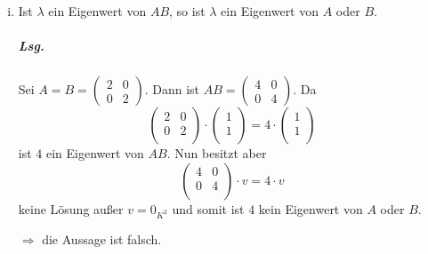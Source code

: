 \documentclass{scrreprt}
\begin{document}
\begin{enumerate}[(i)]
\item Ist $\lambda$ ein Eigenwert von $AB$, so ist $\lambda$ ein Eigenwert von
  $A$ oder $B$.

  \subparagraph{Lsg.} Sei $A = B = \begin{pmatrix}2 & 0 \\0 & 2\end{pmatrix}$.
  Dann ist $AB = \begin{pmatrix}4 & 0\\0 & 4\end{pmatrix}$.
  Da
  \[
    \begin{pmatrix}
      2 & 0 \\
      0 & 2 \\
    \end{pmatrix} \cdot \begin{pmatrix}
      1 \\
      1 \\
    \end{pmatrix} = 4 \cdot \begin{pmatrix}
      1 \\
      1 \\
    \end{pmatrix}
  \]
  ist $4$ ein Eigenwert von $AB$.
  Nun besitzt aber
  \[
    \begin{pmatrix}
      4 & 0 \\
      0 & 4 \\
    \end{pmatrix} \cdot v = 4 \cdot v
  \]
  keine Lösung außer $v = 0_{K^2}$ und somit ist $4$ kein Eigenwert von $A$ oder
  $B$.

  $\Rightarrow$ die Aussage ist falsch.
\end{enumerate}
\end{document}
